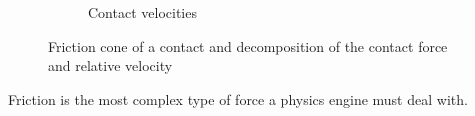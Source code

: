 \begin{figure}[htp]
\begin{subfigure}[b]{0.47\textwidth}
	\caption{Contact velocities}
	\label{fig:friction_cube}
\end{subfigure}
\caption[Friction cone and relative velocities]{Friction cone of a contact and decomposition of the contact force and relative velocity}
\label{fig:ph}
\end{figure}

Friction is the most complex type of force a physics engine must deal with. 
